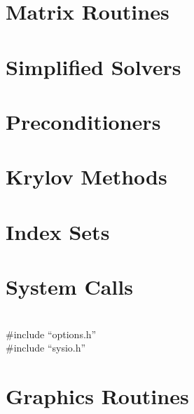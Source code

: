 {\small
\noindent

}

\section{Matrix Routines}


{\small
\noindent

}

\section{Simplified Solvers}


{\small
\noindent

}

\section{Preconditioners}


{\small
\noindent

}

\section{Krylov Methods}


{\small
\noindent

}

\section{Index Sets}


{\small
\noindent

}

\section{System Calls}

 \\
{  \#include ``options.h''} \\
{  \#include ``sysio.h''}

{\small
\noindent

}

\section{Graphics Routines}


{\small
\noindent

}


